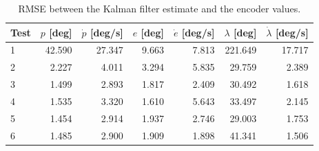 \begin{table}[htbp]
  \centering
  \caption{RMSE between the Kalman filter estimate and the encoder values.}
  \label{tab:lab4_rmse_kalman}
  \begin{tabular}{lrrrrrr}
    \toprule
    Test & $p$ [deg] & $\dot{p}$ [deg/s] & $e$ [deg] & $\dot{e}$ [deg/s] & $\lambda$ [deg] & $\dot{\lambda}$ [deg/s] \\
    \midrule
    1 & 42.590 & 27.347 & 9.663 & 7.813 & 221.649 & 17.717 \\
    2 & 2.227 & 4.011 & 3.294 & 5.835 & 29.759 & 2.389 \\
    3 & 1.499 & 2.893 & 1.817 & 2.409 & 30.492 & 1.618 \\
    4 & 1.535 & 3.320 & 1.610 & 5.643 & 33.497 & 2.145 \\
    5 & 1.454 & 2.914 & 1.937 & 2.746 & 29.003 & 1.753 \\
    6 & 1.485 & 2.900 & 1.909 & 1.898 & 41.341 & 1.506 \\
    \bottomrule
  \end{tabular}
\end{table}
